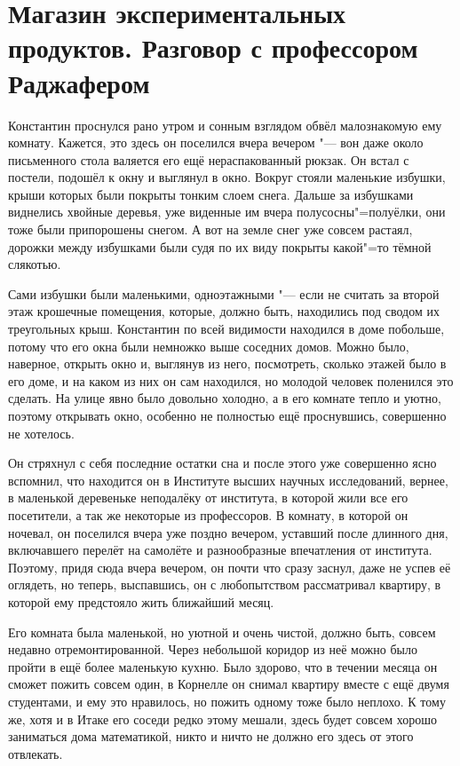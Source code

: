 \section[Магазин экспериментальных продуктов]
{Магазин экспериментальных продуктов. Разговор с профессором Раджафером}

Константин проснулся рано утром и сонным взглядом обвёл малознакомую ему комнату.
Кажется, это здесь он поселился вчера вечером "--- вон даже около письменного
стола валяется его ещё нераспакованный рюкзак.
Он встал с постели, подошёл к окну и выглянул в окно.
Вокруг стояли маленькие избушки, крыши которых были покрыты тонким слоем снега.
Дальше за избушками виднелись хвойные деревья, уже виденные им вчера
полусосны"=полуёлки, они тоже были припорошены снегом.
А вот на земле снег уже совсем растаял, дорожки между избушками были судя по их
виду покрыты какой"=то тёмной слякотью.

Сами избушки были маленькими, одноэтажными "--- если не считать за второй этаж
крошечные помещения, которые, должно быть, находились под сводом их треугольных
крыш.
Константин по всей видимости находился в доме побольше, потому что его окна были
немножко выше соседних домов.
Можно было, наверное, открыть окно и, выглянув из него, посмотреть, сколько
этажей было в его доме, и на каком из них он сам находился, но молодой человек
поленился это сделать.
На улице явно было довольно холодно, а в его комнате тепло и уютно, поэтому
открывать окно, особенно не полностью ещё проснувшись, совершенно не хотелось.

Он стряхнул с себя последние остатки сна и после этого уже совершенно ясно
вспомнил, что находится он в Институте высших научных исследований, вернее, в
маленькой деревеньке неподалёку от института, в которой жили все его посетители,
а так же некоторые из профессоров.
В комнату, в которой он ночевал, он поселился вчера уже поздно вечером, уставший
после длинного дня, включавшего перелёт на самолёте и разнообразные впечатления
от института.
Поэтому, придя сюда вчера вечером, он почти что сразу заснул, даже не успев её
оглядеть, но теперь, выспавшись, он с любопытством рассматривал квартиру, в
которой ему предстояло жить ближайший месяц.

Его комната была маленькой, но уютной и очень чистой, должно быть, совсем
недавно отремонтированной.
Через небольшой коридор из неё можно было пройти в ещё более маленькую кухню.
Было здорово, что в течении месяца он сможет пожить совсем один, в Корнелле он
снимал квартиру вместе с ещё двумя студентами, и ему это нравилось, но пожить
одному тоже было неплохо.
К тому же, хотя и в Итаке его соседи редко этому мешали, здесь будет совсем
хорошо заниматься дома математикой, никто и ничто не должно его здесь от этого
отвлекать.

